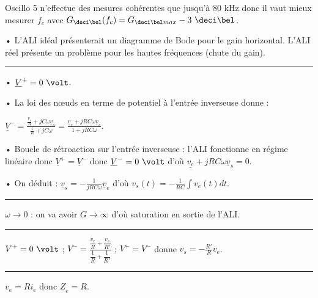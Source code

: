 \documentclass[a4paper,10pt]{article}
\def\d{\displaystyle}
\def\so{\underline}
\def\esp{\vspace{0.2cm}}
\def\noi{\noindent}
\begin{document}
Oscillo 5 n'effectue des mesures cohérentes que jusqu'à 80 kHz donc il vaut mieux mesurer $f_c$ avec $G_{\deci\bel}(f_c) = G_{\deci\bel max} - 3\ \deci\bel$.
\esp

\noi
• L'ALI idéal présenterait un diagramme de Bode pour le gain horizontal. L'ALI réel présente un problème pour les hautes fréquences (chute du gain).

\hspace{-0.5cm}\rule{\linewidth}{.5pt}

\esp
\noi
{}
\esp

\noi 
• $\so{V}^+ = 0\ \volt$.
\esp

\noi
• La loi des nœuds en terme de potentiel à l'entrée inverseuse donne :
\vspace{0.1cm}

$\d \so{V}^- = \frac{\frac{\so{v}_e}{R} +jC\omega\so{v}_s}{\frac{1}{R} + jC\omega} = \frac{\so{v}_e + jRC\omega \so{v}_s}{1 + jRC\omega}$.
\esp

\noi
• Boucle de rétroaction sur l'entrée inverseuse : l'ALI fonctionne en régime linéaire donc $\so{V}^+ = \so{V}^-$ donc $\so{V}^- = 0\ \volt$ d'où $\so{v_e} + jRC\omega \so{v}_s = 0$.
\esp

\noi
• On déduit : $\d \so{v}_s = -\frac{1}{jRC\omega}\so{v}_e$ d'où $\d v_s(t) = -\frac{1}{RC}\int v_e(t) dt$.

\hspace{-0.5cm}\rule{\linewidth}{.5pt}

\esp
\noi
{}
\esp

\noi 
$\omega \rightarrow 0$ : on va avoir $G \rightarrow \infty$ d'où saturation en sortie de l'ALI.

\hspace{-0.5cm}\rule{\linewidth}{.5pt}

\esp
\noi
{}
\esp

\noi 
$\d V^+ = 0\ \volt$ ; $\d V^- = \frac{\dfrac{v_e}{R} + \dfrac{v_s}{R'}}{\dfrac{1}{R} + \dfrac{1}{R'}}$ ; $V^+ = V^-$ donne $\d v_s = -\frac{R'}{R}v_e$.

\hspace{-0.5cm}\rule{\linewidth}{.5pt}

\esp
\noi
{}
\esp

\noi 
$v_e = Ri_e$ donc $\so{Z}_e = R$.
 
\end{document}
